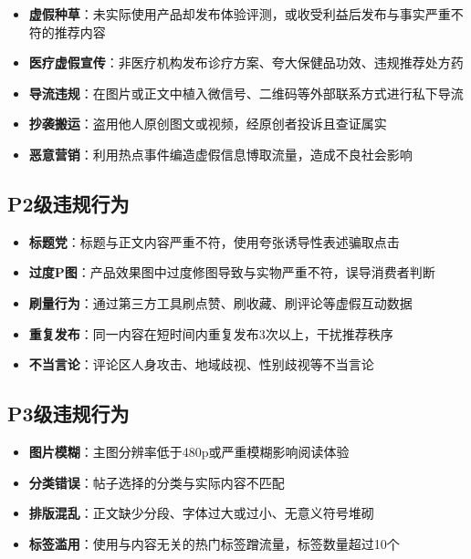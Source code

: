 \documentclass[a4paper,12pt]{article}
\begin{document}
\begin{itemize}[noitemsep]
  \item \textbf{虚假种草}：未实际使用产品却发布体验评测，或收受利益后发布与事实严重不符的推荐内容
  \item \textbf{医疗虚假宣传}：非医疗机构发布诊疗方案、夸大保健品功效、违规推荐处方药
  \item \textbf{导流违规}：在图片或正文中植入微信号、二维码等外部联系方式进行私下导流
  \item \textbf{抄袭搬运}：盗用他人原创图文或视频，经原创者投诉且查证属实
  \item \textbf{恶意营销}：利用热点事件编造虚假信息博取流量，造成不良社会影响
\end{itemize}

\subsection{P2级违规行为}

\begin{itemize}[noitemsep]
  \item \textbf{标题党}：标题与正文内容严重不符，使用夸张诱导性表述骗取点击
  \item \textbf{过度P图}：产品效果图中过度修图导致与实物严重不符，误导消费者判断
  \item \textbf{刷量行为}：通过第三方工具刷点赞、刷收藏、刷评论等虚假互动数据
  \item \textbf{重复发布}：同一内容在短时间内重复发布3次以上，干扰推荐秩序
  \item \textbf{不当言论}：评论区人身攻击、地域歧视、性别歧视等不当言论
\end{itemize}

\subsection{P3级违规行为}

\begin{itemize}[noitemsep]
  \item \textbf{图片模糊}：主图分辨率低于480p或严重模糊影响阅读体验
  \item \textbf{分类错误}：帖子选择的分类与实际内容不匹配
  \item \textbf{排版混乱}：正文缺少分段、字体过大或过小、无意义符号堆砌
  \item \textbf{标签滥用}：使用与内容无关的热门标签蹭流量，标签数量超过10个
\end{itemize}

\end{document}
